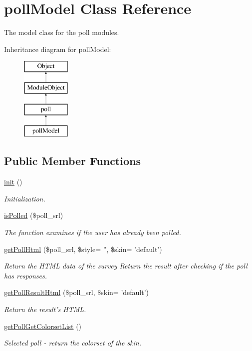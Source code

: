 \hypertarget{classpollModel}{\section{poll\+Model Class Reference}
\label{classpollModel}
}


The model class for the poll modules.  


Inheritance diagram for poll\+Model\+:\begin{figure}[H]
\begin{center}
\leavevmode
\includegraphics[height=4.000000cm]{classpollModel}
\end{center}
\end{figure}
\subsection*{Public Member Functions}
\begin{DoxyCompactItemize}
\item 
\hyperlink{classpollModel_a201866e44c1ba55917c57b15ae37f984}{init} ()
\begin{DoxyCompactList}\small\item\em Initialization. \end{DoxyCompactList}\item 
\hyperlink{classpollModel_a2364a327ffba2641db0722cdcf0c40d7}{is\+Polled} (\$poll\+\_\+srl)
\begin{DoxyCompactList}\small\item\em The function examines if the user has already been polled. \end{DoxyCompactList}\item 
\hyperlink{classpollModel_adf54e16d01ff98966cfc330c667b9898}{get\+Poll\+Html} (\$poll\+\_\+srl, \$style= '', \$skin= 'default')
\begin{DoxyCompactList}\small\item\em Return the H\+T\+M\+L data of the survey Return the result after checking if the poll has responses. \end{DoxyCompactList}\item 
\hyperlink{classpollModel_a2353dcbc141fa99d8fe05b223f738372}{get\+Poll\+Result\+Html} (\$poll\+\_\+srl, \$skin= 'default')
\begin{DoxyCompactList}\small\item\em Return the result's H\+T\+M\+L. \end{DoxyCompactList}\item 
\hyperlink{classpollModel_a350de71f668751cd553fc60aca3fa72c}{get\+Poll\+Get\+Colorset\+List} ()
\begin{DoxyCompactList}\small\item\em Selected poll -\/ return the colorset of the skin. \end{DoxyCompactList}\end{DoxyCompactItemize}
